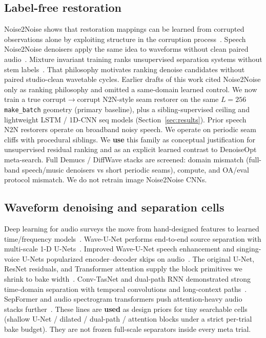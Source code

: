 \subsection{Label-free restoration}
Noise2Noise shows that restoration mappings can be learned from corrupted observations alone by exploiting structure in the corruption process~\cite{lehtinen2018}.
Speech Noise2Noise denoisers apply the same idea to waveforms without clean paired audio~\cite{kashyap2021n2n}.
Mixture invariant training ranks unsupervised separation systems without stem labels~\cite{wisdom2020}.
That philosophy motivates ranking denoise candidates without paired studio-clean wavetable cycles.
Earlier drafts of this work cited Noise2Noise only as ranking philosophy and omitted a same-domain learned control.
We now train a true corrupt$\to$corrupt N2N-style seam restorer on the same $L{=}256$ \texttt{make\_batch} geometry (primary baseline), plus a sibling-supervised ceiling and lightweight LSTM / 1D-CNN seq models (Section~\ref{sec:results}).
Prior speech N2N restorers operate on broadband noisy speech.
We operate on periodic seam cliffs with procedural siblings.
We \textbf{use} this family as conceptual justification for unsupervised residual ranking and as an explicit learned contrast to DenoiseOpt meta-search.
Full Demucs / DiffWave stacks are screened: domain mismatch (full-band speech/music denoisers vs short periodic seams), compute, and OA/eval protocol mismatch.
We do not retrain image Noise2Noise CNNs.

\subsection{Waveform denoising and separation cells}
Deep learning for audio surveys the move from hand-designed features to learned time/frequency models~\cite{purwins2019}.
Wave-U-Net performs end-to-end source separation with multi-scale 1-D U-Nets~\cite{stoller2018}.
Improved Wave-U-Net speech enhancement and singing-voice U-Nets popularized encoder--decoder skips on audio~\cite{macartney2018,jansson2017}.
The original U-Net, ResNet residuals, and Transformer attention supply the block primitives we shrink to bake width~\cite{ronneberger2015,he2016resnet,vaswani2017}.
Conv-TasNet and dual-path RNN demonstrated strong time-domain separation with temporal convolutions and long-context paths~\cite{luo2019,luo2020dprnn}.
SepFormer and audio spectrogram transformers push attention-heavy audio stacks further~\cite{subakan2021,gong2021ast}.
These lines are \textbf{used} as design priors for tiny searchable cells (shallow U-Net / dilated / dual-path / attention blocks under a strict per-trial bake budget).
They are not frozen full-scale separators inside every meta trial.

